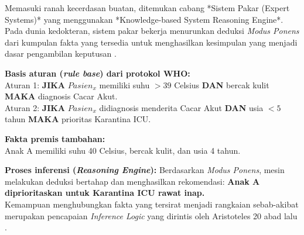 Memasuki ranah kecerdasan buatan, ditemukan cabang *Sistem Pakar (Expert Systems)* yang menggunakan *Knowledge-based System Reasoning Engine*. Pada dunia kedokteran, sistem pakar bekerja menurunkan deduksi \textit{Modus Ponens} dari kumpulan fakta yang tersedia untuk menghasilkan kesimpulan yang menjadi dasar pengambilan keputusan \cite{mit_6042,saylor_cs202}.

\begin{contoh}

\textbf{Basis aturan (\textit{rule base}) dari protokol WHO:}\\
Aturan 1: \textbf{JIKA} $Pasien_{x}$ memiliki suhu $> 39$ Celsius \textbf{DAN} bercak kulit \textbf{MAKA} diagnosis Cacar Akut.\\
Aturan 2: \textbf{JIKA} $Pasien_{x}$ didiagnosis menderita Cacar Akut \textbf{DAN} usia $< 5$ tahun \textbf{MAKA} prioritas Karantina ICU.

\textbf{Fakta premis tambahan:} \\
Anak A memiliki suhu 40 Celsius, bercak kulit, dan usia 4 tahun.

\textbf{Proses inferensi (\textit{Reasoning Engine}):} 
Berdasarkan \textit{Modus Ponens}, mesin melakukan deduksi bertahap dan menghasilkan rekomendasi: \textbf{Anak A diprioritaskan untuk Karantina ICU rawat inap.} \\
Kemampuan menghubungkan fakta yang tersirat menjadi rangkaian sebab-akibat merupakan pencapaian \textit{Inference Logic} yang dirintis oleh Aristoteles 20 abad lalu \cite{stanford_cs103}.
\end{contoh}
